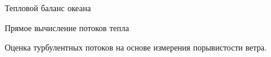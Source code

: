 \begin{chapter}{Тепловой баланс океана}
\begin{section}{Прямое вычисление потоков тепла}
\begin{paragraph}{Оценка турбулентных потоков на основе измерения порывистости
ветра.}
\end{paragraph}


\end{section}
\end{chapter}
